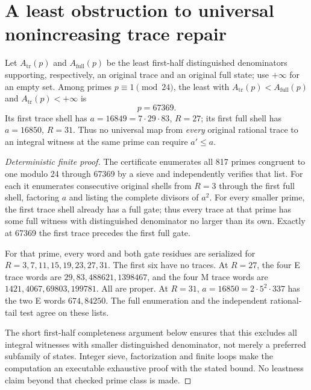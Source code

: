 \section{A least obstruction to universal nonincreasing trace repair}\label{sec:prefix}
\begin{theorem}\label{thm:least}
Let $A_{\mathrm{tr}}(p)$ and $A_{\mathrm{full}}(p)$ be the least first-half
distinguished denominators supporting, respectively, an original trace and
an original full state; use $+\infty$ for an empty set. Among primes
$p\equiv1\pmod{24}$, the least with
$A_{\mathrm{tr}}(p)<A_{\mathrm{full}}(p)$ and $A_{\mathrm{tr}}(p)<+\infty$ is
\[
 p=67369.
\]
Its first trace shell has $a=16849=7\cdot29\cdot83$, $R=27$; its first full
shell has $a=16850$, $R=31$. Thus no universal map from \emph{every} original
rational trace to an integral witness at the same prime can require $a'\le a$.
\end{theorem}
\begin{proof}[Deterministic finite proof]
The certificate enumerates all 817 primes congruent to one modulo 24 through
67369 by a sieve and independently verifies that list. For each it enumerates
consecutive original shells from $R=3$ through the first full shell, factoring
$a$ and listing the complete divisors of $a^2$. For every smaller prime, the
first trace shell already has a full gate; thus every trace at that prime has
some full witness with distinguished denominator no larger than its own.
Exactly at 67369 the first trace precedes the first full gate.

For that prime, every word and both gate residues are serialized for
$R=3,7,11,15,19,23,27,31$. The first six have no traces. At $R=27$, the four
E trace words are $29,83,488621,1398467$, and the four M trace words are
$1421,4067,69803,199781$. All are proper. At $R=31$, $a=16850=2\cdot5^2\cdot337$
has the two E words $674,84250$. The full enumeration and the independent
rational-tail test agree on these lists.

The short first-half completeness argument below ensures that this excludes
all integral witnesses with smaller distinguished denominator, not merely a
preferred subfamily of states. Integer sieve, factorization and finite loops
make the computation an executable exhaustive proof with the stated bound.
No leastness claim beyond that checked prime class is made.
\end{proof}

